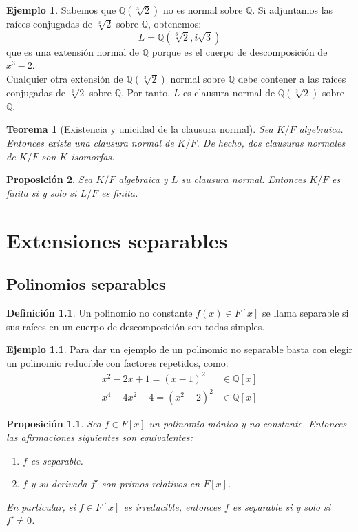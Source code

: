 \documentclass{report}
\newtheorem{theorem}{Teorema}[chapter]
\newtheorem{proposition}[theorem]{Proposición}
\theoremstyle{remark}
\theoremstyle{definition}
\newtheorem{definition}{Definición}[chapter]
\theoremstyle{definition}
\theoremstyle{definition}
\newtheorem*{example}{Ejemplo}
\begin{document}
\begin{example}
    Sabemos que $\mathbb{Q}(\sqrt[3]{2})$ no es normal sobre $\mathbb{Q}$. Si adjuntamos las raíces conjugadas de $\sqrt[3]{2}$ sobre $\mathbb{Q}$, obtenemos:
    $$L = \mathbb{Q}(\sqrt[3]{2}, i\sqrt{3})$$
    que es una extensión normal de $\mathbb{Q}$ porque es el cuerpo de descomposición de $x^3-2$.\\
    Cualquier otra extensión de $\mathbb{Q}(\sqrt[3]{2})$ normal sobre $\mathbb{Q}$ debe contener a las raíces conjugadas de $\sqrt[3]{2}$ sobre $\mathbb{Q}$.
    Por tanto, $L$ es clausura normal de $\mathbb{Q}(\sqrt[3]{2})$ sobre $\mathbb{Q}$.
\end{example}

\begin{theorem}[Existencia y unicidad de la clausura normal]
    Sea $K/F$ algebraica. Entonces existe una clausura normal de $K/F$. De hecho, dos clausuras normales de $K/F$ son $K$-isomorfas.
\end{theorem}

\begin{proposition}
    Sea $K/F$ algebraica y $L$ su clausura normal. Entonces $K/F$ es finita si y solo si $L/F$ es finita.
\end{proposition}

\chapter{Extensiones separables}
\section{Polinomios separables}

\begin{definition}
    Un polinomio no constante $f(x) \in F[x]$ se llama separable si sus raíces en un cuerpo de descomposición son todas simples.
\end{definition}

\begin{example}
    Para dar un ejemplo de un polinomio no separable basta con elegir un polinomio reducible con factores repetidos, como:
    \begin{align*}
        x^2-2x+1 = (x-1)^2     & \in \mathbb{Q}[x] \\
        x^4-4x^2+4 = (x^2-2)^2 & \in \mathbb{Q}[x]
    \end{align*}
\end{example}

\begin{proposition}
    Sea $f \in F[x]$ un polinomio mónico y no constante. Entonces las afirmaciones siguientes son equivalentes:
    \begin{enumerate}
        \item $f$ es separable.
        \item $f$ y su derivada $f'$ son primos relativos en $F[x]$.
    \end{enumerate}
    En particular, si $f \in F[x]$ es irreducible, entonces $f$ es separable si y solo si $f' \neq 0$.
\end{proposition}
\end{document}
